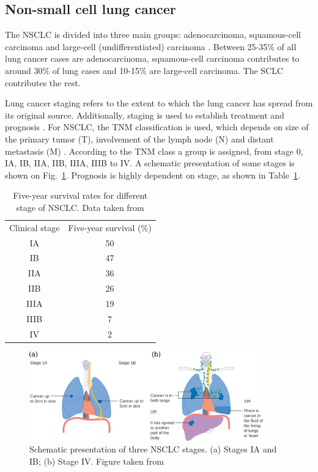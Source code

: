 \subsection{Non-small cell lung cancer}

The NSCLC is divided into three main groups: adenocarcinoma, squamous-cell carcinoma and large-cell (undifferentiated) carcinoma \cite{Kasper2015}.
Between 25-35\% of all lung cancer cases are adenocarcinoma, squamous-cell carcinoma contributes to around 30\% of lung cases and 10-15\% are large-cell carcinoma. The SCLC contributes the rest. 

Lung cancer staging refers to the extent to which the lung cancer has spread from its original source. Additionally, staging is used to establish treatment and prognosis \cite{Chheang2013}. For NSCLC, the TNM classification is used, which depends on
size of the primary tumor (T), involvement of the lymph node (N) and distant metastasis (M) \cite{Kasper2015}. According to the TNM class a group is assigned, from stage 0, IA, IB, IIA, IIB, IIIA, IIIB to IV. 
A schematic presentation of some stages is shown on Fig.~\ref{Fig:Stages}. Prognosis is highly dependent on stage, as shown in Table~\ref{tab:prognosis}.

\begin{table}[H]
  \centering
  \caption{Five-year survival rates for different stage of NSCLC. Data taken from \cite{Rami2009}}
  \begin{tabular}{|c|c|}
   \hline
   \hline
Clinical stage & Five-year survival (\%) \\
IA & 50 \\
IB & 47 \\
IIA & 36 \\
IIB & 26 \\
IIIA & 19 \\
IIIB & 7 \\
IV & 2 \\
\hline
\hline
  \end{tabular}
  \label{tab:prognosis}
\end{table}

\begin{figure}[H]
\begin{center}
\includegraphics[width=0.9\textwidth]{./Fundamentals/Images/Stages.png}
\caption{Schematic presentation of three NSCLC stages. (a) Stages IA and IB; (b) Stage IV. Figure taken from \cite{CancerStage}}
\label{Fig:Stages}
\end{center}
\end{figure}

